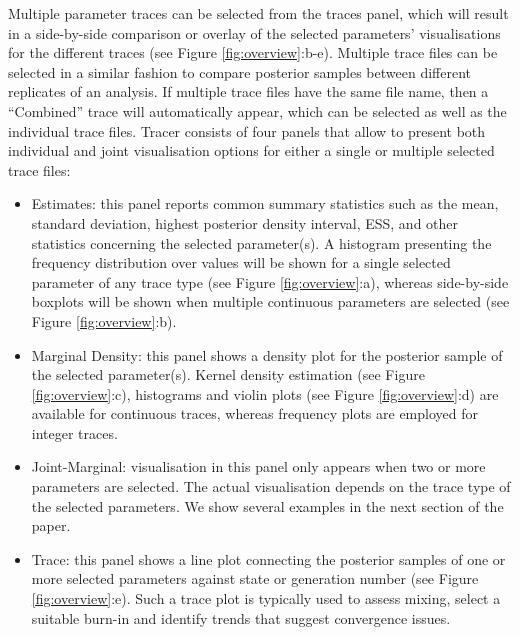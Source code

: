 \documentclass{bioinfo}
\begin{document}
Multiple parameter traces can be selected from the traces panel, which will result in a side-by-side comparison or overlay of the selected parameters' visualisations for the different traces (see Figure \ref{fig:overview}:b-e). 
Multiple trace files can be selected in a similar fashion to compare posterior samples between different replicates of an analysis. 
If multiple trace files have the same file name,  then a ``Combined'' trace will automatically appear, which can be selected as well as the individual trace files.
Tracer consists of four panels that allow to present both individual and joint visualisation options for either a single or multiple selected trace files:

\begin{itemize}

\item Estimates: this panel reports common summary statistics such as the mean, standard deviation, highest posterior density interval, ESS, and other statistics concerning the selected parameter(s). 
A histogram presenting the frequency distribution over values will be shown for a single selected parameter of any trace type (see Figure \ref{fig:overview}:a), whereas side-by-side boxplots will be shown when multiple continuous parameters are selected (see Figure \ref{fig:overview}:b).

\item Marginal Density: this panel shows a density plot for the posterior sample of the selected parameter(s). Kernel density estimation (see Figure \ref{fig:overview}:c), histograms and violin plots (see Figure \ref{fig:overview}:d) are available for continuous traces, whereas frequency plots are employed for integer traces.

\item Joint-Marginal: visualisation in this panel only appears when two or more parameters are selected. The actual visualisation depends on the trace type of the selected parameters. We show several examples in the next section of the paper.

\item Trace: this panel shows a line plot connecting the posterior samples of one or more selected parameters against state or generation number (see Figure \ref{fig:overview}:e). Such a trace plot is typically used to assess mixing, select a suitable burn-in and identify trends that suggest convergence issues.

\end{itemize}
\end{document}
